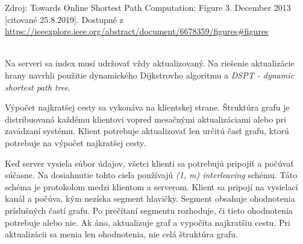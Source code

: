 \begin{footnotesize}
Zdroj: Towards Online Shortest Path Computation: Figure 3. December 2013 [citované 25.8.2019]. Dostupné z \url{https://ieeexplore.ieee.org/abstract/document/6678359/figures#figures}
\end{footnotesize}\\

Na serveri sa index musí udržovať vždy aktualizovaný. Na riešenie aktualizácie hrany navrhli použitie dynamického Dijkstrovho algoritmu a \textit{DSPT - dynamic shortest path tree}. 

Výpočet najkratšej cesty sa vykonáva na klientskej strane. Štruktúra grafu je distribuovaná každému klientovi vopred mesačnými aktualizáciami alebo pri zavádzaní systému. Klient potrebuje aktualizovať len určitú časť grafu, ktorú potrebuje na výpočet najkratšej cesty. 

Keď server vysiela súbor údajov, všetci klienti sa potrebujú pripojiť a počúvať súčasne. Na dosiahnutie tohto cieľa používajú \textit{(1, m) interleaving} schému. Táto schéma je protokolom medzi klientom a serverom. Klient sa pripojí na vysielací kanál a počúva, kým nezíska segment hlavičky. Segment obsahuje ohodnotenia príslušných častí grafu. Po prečítaní segmentu rozhoduje, či tieto ohodnotenia potrebuje alebo nie. Ak áno, aktualizuje graf a vypočíta najkratšiu cestu. Pri aktualizácii sa menia len ohodnotenia, nie celá štruktúra grafu.


